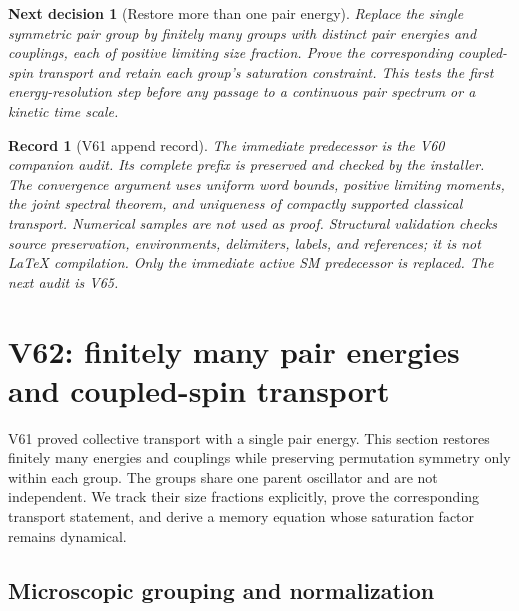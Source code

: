 \documentclass[11pt]{article}
\newtheorem{decision}[theorem]{Next decision}
\newtheorem{record}[theorem]{Record}
\theoremstyle{remark}
\begin{document}
\begin{decision}[Restore more than one pair energy]
\label{dec:v20v61-next}
Replace the single symmetric pair group by finitely
many groups with distinct pair energies and couplings,
each of positive limiting size fraction.  Prove the
corresponding coupled-spin transport and retain each
group's saturation constraint.  This tests the first
energy-resolution step before any passage to a
continuous pair spectrum or a kinetic time scale.
\end{decision}

\begin{record}[V61 append record]
\label{rec:v20v61}
The immediate predecessor is the V60 companion audit.
Its complete prefix is preserved and checked by the
installer.  The convergence argument uses uniform word
bounds, positive limiting moments, the joint spectral
theorem, and uniqueness of compactly supported classical
transport.  Numerical samples are not used as proof.
Structural validation checks source preservation,
environments, delimiters, labels, and references; it
is not LaTeX compilation.  Only the immediate active
SM predecessor is replaced.  The next audit is V65.
\end{record}


\section{V62: finitely many pair energies and coupled-spin transport}
\label{sec:v20v62}

V61 proved collective transport with a single pair energy.
This section restores finitely many energies and couplings
while preserving permutation symmetry only within each group.
The groups share one parent oscillator and are not independent.
We track their size fractions explicitly, prove the corresponding
transport statement, and derive a memory equation whose
saturation factor remains dynamical.

\subsection{Microscopic grouping and normalization}
\end{document}
